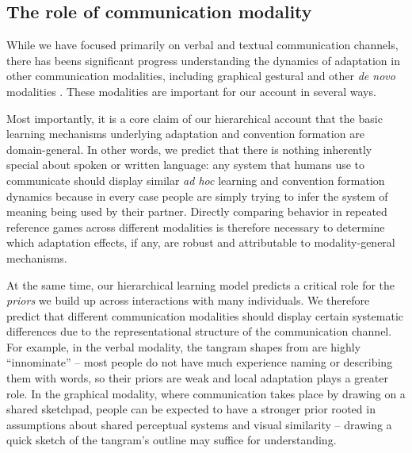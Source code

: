 \subsection{The role of communication modality}


While we have focused primarily on verbal and textual communication channels, there has beens significant progress understanding the dynamics of adaptation in other communication modalities, including graphical \cite{GarrodFayLeeOberlanderMacLeod07_GraphicalSymbolSystems,TheisenEtAl10_SystematicityArbitrariness,hawkins2019disentangling} gestural \cite{FayListerEllisonGoldinMeadow13_GestureBeatsVocalization,motamedi2019evolving,bohn2019young} and other \emph{de novo} modalities \cite{Galantucci05_EmergenceOfCommunication,RobertsGalantucci12_DualityOfPatterning,RobertsEtAl15_IconocityOnCombinatoriality,VerhoefRobertsDingemanse15_Iconicity,VerhoefEtAl16_TemporalLanguage,kempe2019adults}.
These modalities are important for our account in several ways.

Most importantly, it is a core claim of our hierarchical account that the basic learning mechanisms underlying adaptation and convention formation are domain-general.
In other words, we predict that there is nothing inherently special about spoken or written language: any system that humans use to communicate should display similar \emph{ad hoc} learning and convention formation dynamics because in every case people are simply trying to infer the system of meaning being used by their partner.
Directly comparing behavior in repeated reference games across different modalities is therefore necessary to determine which adaptation effects, if any, are robust and attributable to modality-general mechanisms.

At the same time, our hierarchical learning model predicts a critical role for the \emph{priors} we build up across interactions with many individuals.
We therefore predict that different communication modalities should display certain systematic differences due to the representational structure of the communication channel.
For example, in the verbal modality, the tangram shapes from  are highly ``innominate'' \cite{HupetEtAl91_CodabilityReference} -- most people do not have much experience naming or describing them with words, so their priors are weak and local adaptation plays a greater role.
In the graphical modality, where communication takes place by drawing on a shared sketchpad, people can be expected to have a stronger prior rooted in assumptions about shared perceptual systems and visual similarity \cite{fan2018common} -- drawing a quick sketch of the tangram's outline may suffice for understanding.

